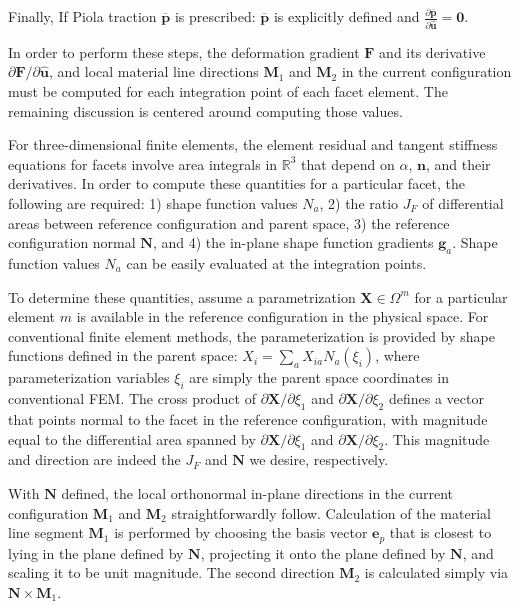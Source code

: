 Finally, If Piola traction $\bm {\overline{p}}$ is prescribed: $\bm {\overline{p}}$ is explicitly defined and $\frac{\partial \bm {\overline{p}}}{\partial {\hat {\bm{u}}}} = {\bm 0}$.

In order to perform these steps, the deformation gradient $\bm{F}$ and its derivative ${\partial \bm{F}}/{\partial \hat{\bm{u}}}$, and local material line directions $\bm{M}_1$ and $\bm{M}_2$ in the current configuration must be computed for each integration point of each facet element. The remaining discussion is centered around computing those values.

For three-dimensional finite elements, the element residual and tangent stiffness equations for facets involve area integrals in $\mathbb{R}^3$ that depend on $\alpha$, $\bm{n}$, and their derivatives. In order to compute these quantities for a particular facet, the following are required: 1) shape function values $N_a$, 2) the ratio $J_F$ of differential areas between reference configuration and parent space, 3) the reference configuration normal ${\bm {N}}$, and 4) the in-plane shape function gradients ${\bm {g}}_a$. Shape function values $N_a$ can be easily evaluated at the integration points. 

To determine these quantities, assume a parametrization $\mathbf{X} \in \Omega^m$ for a particular element $m$ is available in the reference configuration in the physical space. For conventional finite element methods, the parameterization is provided by shape functions defined in the parent space: ${X}_{i} = \sum\limits_{a}{X}_{ia}{N}_a(\xi_i)$, where parameterization variables $\xi_i$ are simply the parent space coordinates in conventional FEM. The cross product of ${\partial{\bm {X}}}/{\partial \xi_1}$ and ${\partial{\bm {X}}}/{\partial \xi_2}$ defines a vector that points normal to the facet in the reference configuration, with magnitude equal to the differential area spanned by ${\partial{\bm {X}}}/{\partial \xi_1}$ and ${\partial{\bm {X}}}/{\partial \xi_2}$. This magnitude and direction are indeed the $J_F$ and ${\bm {N}}$ we desire, respectively.

With $\bm{N}$ defined, the local orthonormal in-plane directions in the current configuration $\bm{M}_1$ and $\bm{M}_2$ straightforwardly follow. Calculation of the material line segment ${\bm {M}}_1$ is performed by choosing the basis vector ${\bm {e}}_p$ that is closest to lying in the plane defined by ${\bm N}$, projecting it onto the plane defined by $\bm{N}$, and scaling it to be unit magnitude. The second direction ${\bm M}_2$ is calculated simply via ${\bm {N}} \times {\bm {M}}_1$.

